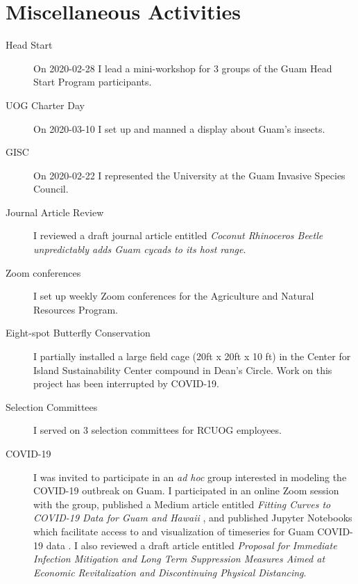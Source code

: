 \section{Miscellaneous Activities}
\begin{refsection}

\begin{description}
	\item[Head Start] On 2020-02-28 I lead a mini-workshop for 3 groups of the Guam Head Start Program participants.
	
	\item[UOG Charter Day] On 2020-03-10 I set up and manned a display about Guam's insects.
	 
	\item[GISC] On 2020-02-22 I represented the University at the Guam Invasive Species Council.
		
	\item[Journal Article Review] I reviewed a draft journal article entitled \textit{Coconut Rhinoceros Beetle unpredictably adds Guam cycads to its host range}.
	
	\item[Zoom conferences] I set up weekly Zoom conferences for the Agriculture and Natural Resources Program.
	
	\item[Eight-spot Butterfly Conservation] I partially installed a large field cage (20ft x 20ft x 10 ft) in the Center for Island Sustainability Center compound in Dean's Circle. Work on this project has been interrupted by COVID-19.
	
	\item[Selection Committees] I served on 3 selection committees for RCUOG employees.
	
	\item[COVID-19] I was invited to participate in an \textit{ad hoc} group interested in modeling the COVID-19 outbreak on Guam.
	I participated in an online Zoom session with the group, published a Medium article entitled \textit{Fitting Curves to COVID-19 Data for Guam and Hawaii} \cite{moore_fitting_2020}, and published Jupyter Notebooks which facilitate access to and visualization of timeseries for Guam COVID-19 data \cite{moore_github_2020}. I also reviewed a draft article entitled \textit{Proposal for Immediate Infection Mitigation and Long Term Suppression Measures Aimed at Economic Revitalization and Discontinuing Physical Distancing}.
		
\end{description}
\printbibliography[heading=none]
\end{refsection}



